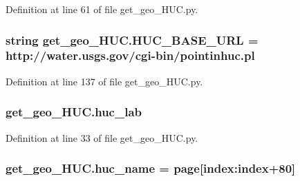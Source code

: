 Definition at line 61 of file get\+\_\+geo\+\_\+\+H\+U\+C.\+py.

\subsubsection[{\texorpdfstring{H\+U\+C\+\_\+\+B\+A\+S\+E\+\_\+\+U\+RL}{HUC_BASE_URL}}]{\setlength{\rightskip}{0pt plus 5cm}string get\+\_\+geo\+\_\+\+H\+U\+C.\+H\+U\+C\+\_\+\+B\+A\+S\+E\+\_\+\+U\+RL = \textquotesingle{}http\+://water.\+usgs.\+gov/cgi-\/bin/pointinhuc.\+pl\textquotesingle{}}\hypertarget{namespaceget__geo___h_u_c_aec26fed42e6a2aa5dd3adef771e80f56}{}\label{namespaceget__geo___h_u_c_aec26fed42e6a2aa5dd3adef771e80f56}


Definition at line 137 of file get\+\_\+geo\+\_\+\+H\+U\+C.\+py.

\subsubsection[{\texorpdfstring{huc\+\_\+lab}{huc_lab}}]{\setlength{\rightskip}{0pt plus 5cm}get\+\_\+geo\+\_\+\+H\+U\+C.\+huc\+\_\+lab}\hypertarget{namespaceget__geo___h_u_c_adae93ea1e2d42a6d3c9992ae2e2277a0}{}\label{namespaceget__geo___h_u_c_adae93ea1e2d42a6d3c9992ae2e2277a0}


Definition at line 33 of file get\+\_\+geo\+\_\+\+H\+U\+C.\+py.

\subsubsection[{\texorpdfstring{huc\+\_\+name}{huc_name}}]{\setlength{\rightskip}{0pt plus 5cm}get\+\_\+geo\+\_\+\+H\+U\+C.\+huc\+\_\+name = {\bf page}\mbox{[}index\+:index+80\mbox{]}}\hypertarget{namespaceget__geo___h_u_c_abade12bbf1229daaa34a0760a56ef195}{}\label{namespaceget__geo___h_u_c_abade12bbf1229daaa34a0760a56ef195}


